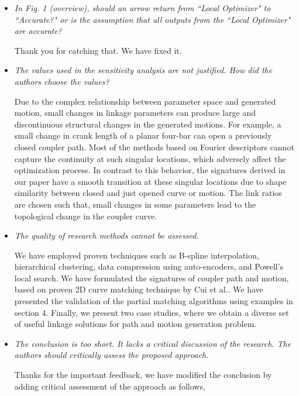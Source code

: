 \documentclass{article}
\begin{document}
\begin{itemize}
  \item \emph{
  In Fig. 1 (overview), should an arrow return from ``Local Optimizer" to ``Accurate?" or is the assumption that all outputs from the ``Local Optimizer" are accurate?
}

Thank you for catching that. We have fixed it.\\

  \item \emph{The values used in the sensitivity analysis are not justified. How did the authors choose the values?
}

Due to the complex relationship between parameter space and generated motion, small changes in linkage parameters can produce large and discontinuous structural changes in the generated motions.
For example, a small change in crank length of a  planar four-bar can open a previously closed coupler path.
Most of the methods based on Fourier descriptors cannot capture the continuity at such singular locations, which adversely affect the optimization process.
In contrast to this behavior, the signatures derived in our paper have a smooth transition at these singular locations due to shape similarity between closed and just opened curve or motion. The link ratios are chosen such that, small changes in some parameters lead to the topological change in the coupler curve.\\

  \item \emph{
The quality of research methods cannot be assessed.
}

We have employed  proven techniques such as B-spline interpolation, hierarchical clustering, data compression using auto-encoders, and Powell's local search.
We have formulated the signatures of coupler path and motion, based on proven 2D curve matching technique by Cui et al.\cite{cui2009}.
We have presented the validation of the partial matching algorithms using examples in section 4.
Finally, we present two case studies, where we obtain a diverse set of useful linkage solutions for path and motion generation problem.
\\

  \item \emph{
The conclusion is too short. It lacks a critical discussion of the research. The authors should critically assess the proposed approach.
}

Thanks for the important feedback, we have modified the conclusion by adding critical assessment of the approach as follows,


\end{itemize}
\end{document}
